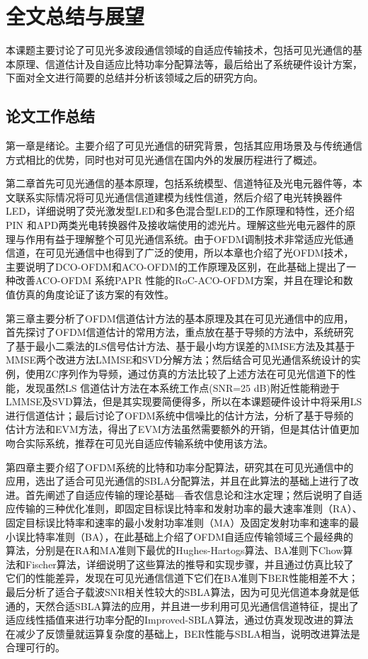 \chapter{全文总结与展望}
本课题主要讨论了可见光多波段通信领域的自适应传输技术，包括可见光通信的基本原理、信道估计及自适应比特功率分配算法等，最后给出了系统硬件设计方案，下面对全文进行简要的总结并分析该领域之后的研究方向。
\section{论文工作总结}
第一章是绪论。主要介绍了可见光通信的研究背景，包括其应用场景及与传统通信方式相比的优势，同时也对可见光通信在国内外的发展历程进行了概述。

第二章首先可见光通信的基本原理，包括系统模型、信道特征及光电元器件等，本文联系实际情况将可见光通信信道建模为线性信道，然后介绍了电光转换器件LED，详细说明了荧光激发型LED和多色混合型LED的工作原理和特性，还介绍PIN 和APD两类光电转换器件及接收端使用的滤光片。理解这些光电元器件的原理与作用有益于理解整个可见光通信系统。由于OFDM调制技术非常适应光低通信道，在可见光通信中也得到了广泛的使用，所以本章也介绍了光OFDM技术，主要说明了DCO-OFDM和ACO-OFDM的工作原理及区别，在此基础上提出了一种改善ACO-OFDM 系统PAPR 性能的RoC-ACO-OFDM方案，并且在理论和数值仿真的角度论证了该方案的有效性。

第三章主要分析了OFDM信道估计方法的基本原理及其在可见光通信中的应用，首先探讨了OFDM信道估计的常用方法，重点放在基于导频的方法中，系统研究了基于最小二乘法的LS信号估计方法、基于最小均方误差的MMSE方法及其基于MMSE两个改进方法LMMSE和SVD分解方法；然后结合可见光通信系统设计的实例，使用ZC序列作为导频，通过仿真的方法比较了上述方法在可见光信道下的性能，发现虽然LS 信道估计方法在本系统工作点(SNR=25 dB)附近性能稍逊于LMMSE及SVD算法，但是其实现要简便得多，所以在本课题硬件设计中将采用LS进行信道估计；最后讨论了OFDM系统中信噪比的估计方法，分析了基于导频的估计方法和EVM方法，得出了EVM方法虽然需要额外的开销，但是其估计值更加吻合实际系统，推荐在可见光自适应传输系统中使用该方法。

第四章主要介绍了OFDM系统的比特和功率分配算法，研究其在可见光通信中的应用，选出了适合可见光通信的SBLA分配算法，并且在此算法的基础上进行了改进。首先阐述了自适应传输的理论基础—香农信息论和注水定理；然后说明了自适应传输的三种优化准则，即固定目标误比特率和发射功率的最大速率准则（RA）、固定目标误比特率和速率的最小发射功率准则（MA）及固定发射功率和速率的最小误比特率准则（BA），在此基础上介绍了OFDM自适应传输领域三个最经典的算法，分别是在RA和MA准则下最优的Hughes-Hartogs算法、BA准则下Chow算法和Fischer算法，详细说明了这些算法的推导和实现步骤，并且通过仿真比较了它们的性能差异，发现在可见光通信信道下它们在BA准则下BER性能相差不大；最后分析了适合子载波SNR相关性较大的SBLA算法，因为可见光信道本身就是低通的，天然合适SBLA算法的应用，并且进一步利用可见光通信信道特征，提出了适应线性插值来进行功率分配的Improved-SBLA算法，通过仿真发现改进的算法在减少了反馈量就运算复杂度的基础上，BER性能与SBLA相当，说明改进算法是合理可行的。

